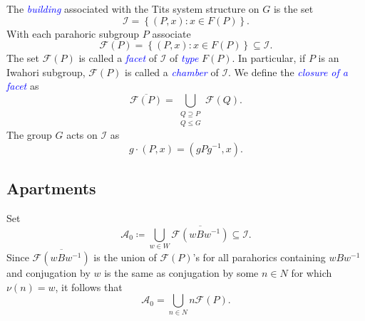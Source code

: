 \documentclass{article}
\theoremstyle{thmstyle}
\theoremstyle{defstyle}
\newcommand{\scrA}{\mathscr{A}}
\newcommand{\scrF}{\mathscr{F}}
\newcommand{\scrI}{\mathscr{I}}
\newcommand{\define}[1]{\textcolor{blue}{\textit{#1}}}
\renewcommand{\le}{\leqslant}
\begin{document}
The \define{building} associated with the Tits system structure on $G$ is the set 
\begin{equation*}
    \scrI = \left\{(P, x)\colon x\in F(P)\right\}.
\end{equation*}
With each parahoric subgroup $P$ associate 
\begin{equation*}
    \scrF(P) = \left\{(P, x)\colon x\in F(P)\right\}\subseteq\scrI.
\end{equation*}
The set $\scrF(P)$ is called a \define{facet} of $\scrI$ of \define{type} $F(P)$. In particular, if $P$ is an Iwahori subgroup, $\scrF(P)$ is called a \define{chamber} of $\scrI$. We define the \define{closure of a facet} as 
\begin{equation*}
    \overline{\scrF(P)} = \bigcup_{\substack{Q\supseteq P\\ Q\le G}} \scrF(Q).
\end{equation*}
The group $G$ acts on $\scrI$ as 
\begin{equation*}
    g\cdot(P, x) = \left(gPg^{-1}, x\right).
\end{equation*}

\subsection{Apartments}

Set 
\begin{equation*}
    \scrA_0 \coloneq \bigcup_{w\in W}\overline{\scrF(wBw^{-1})}\subseteq\scrI.
\end{equation*}
Since $\overline{\scrF(w Bw^{-1})}$ is the union of $\scrF(P)$'s for all parahorics containing $wBw^{-1}$ and conjugation by $w$ is the same as conjugation by some $n\in N$ for which $\nu(n) = w$, it follows that 
\begin{equation*}
    \scrA_0 = \bigcup_{n\in N}n\scrF(P).
\end{equation*}
\end{document}
